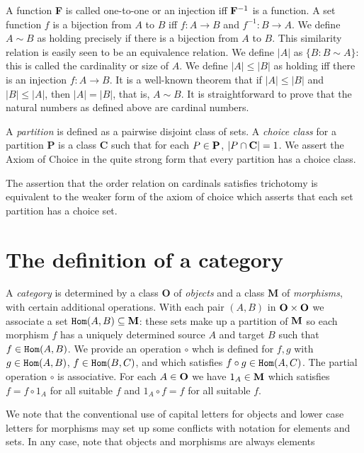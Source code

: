 \documentclass[12pt]{article}
\begin{document}
A function {\bf F} is called one-to-one or an injection iff ${\bf F}^{-1}$ is a function.  A set function $f$ is a bijection from $A$ to $B$ iff $f:A \rightarrow B$ and $f^{-1}:B \rightarrow A$.
We define $A \sim B$ as holding precisely if there is a bijection from $A$ to $B$.  This similarity relation is easily seen to be an equivalence relation.  We define
$|A|$ as $\{B:B \sim A\}$:  this is called the cardinality or size of $A$.  We define $|A| \leq |B|$ as holding iff there is an injection $f:A \rightarrow B$.  It is a well-known theorem that
if $|A| \leq |B|$ and $|B| \leq |A|$, then $|A| = |B|$, that is, $A \sim B$.  It is straightforward to prove that the natural numbers as defined above are cardinal numbers.

A {\em partition\/} is defined as a pairwise disjoint class of sets.  A {\em choice class\/} for a partition {\bf P}  is a class {\bf C} such that for each $P \in {\bf P}$, $|P \cap {\bf C}|=1$.  We assert the Axiom of Choice in the quite strong form that every
partition has a choice class.

The assertion that the order relation on cardinals satisfies trichotomy is equivalent to the weaker form of the axiom of choice which asserts that each set partition has a choice set.

\section{The definition of a category}

A {\em category\/} is determined by a class {\bf O} of {\em objects\/} and a class {\bf M} of {\em morphisms\/}, with certain additional operations.  With each pair $(A,B)$ in ${\bf O \times O}$ we associate a set ${\tt Hom}(A,B) \subseteq {\bf M}$:  these sets make up a partition of ${\bf M}$ so each morphism $f$ has a uniquely determined source $A$ and target $B$ such that $f \in {\tt Hom}(A,B)$.  We provide an operation $\circ$ whch is defined for $f,g$ with $g \in {\tt Hom}(A,B)$, $f \in {\tt Hom}(B,C)$, and which satisfies $f \circ g \in {\tt Hom}(A,C)$.
The partial operation $\circ$ is associative.  For each $A \in {\bf O}$ we have $1_A \in {\bf M}$ which satisfies $f = f \circ 1_A$ for all suitable $f$ and $1_A \circ f = f$ for all suitable $f$.

We note that the conventional use of capital letters for objects and lower case letters for morphisms may set up some conflicts with notation for elements and sets.  In any case, note that objects and morphisms are always elements
\end{document}
